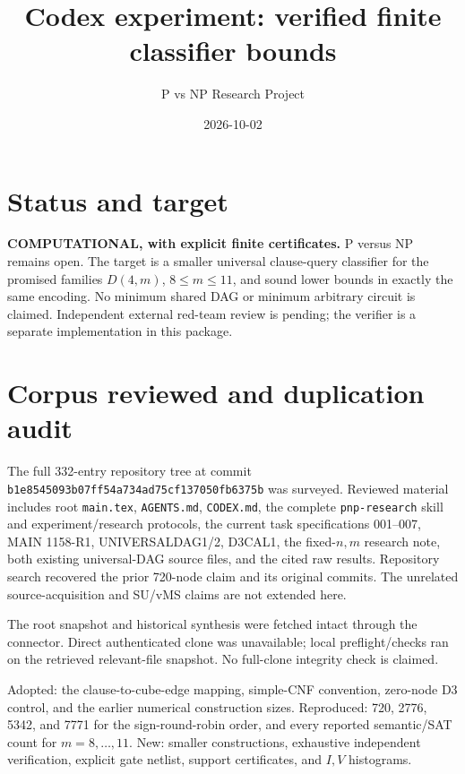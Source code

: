 \documentclass[11pt]{article}
\title{Codex experiment: verified finite classifier bounds}
\author{P vs NP Research Project}
\date{2026-10-02}
\begin{document}
\maketitle
\section*{Status and target}
\textbf{COMPUTATIONAL, with explicit finite certificates.} P versus NP remains open.
The target is a smaller universal clause-query classifier for the promised families
$D(4,m)$, $8\le m\le11$, and sound lower bounds in exactly the same encoding.
No minimum shared DAG or minimum arbitrary circuit is claimed. Independent external
red-team review is pending; the verifier is a separate implementation in this package.

\section*{Corpus reviewed and duplication audit}
The full 332-entry repository tree at commit
\texttt{b1e8545093b07ff54a734ad75cf137050fb6375b} was surveyed. Reviewed material includes
root \texttt{main.tex}, \texttt{AGENTS.md}, \texttt{CODEX.md}, the complete
\texttt{pnp-research} skill and experiment/research protocols, the current task
specifications 001--007, MAIN 1158-R1, UNIVERSALDAG1/2, D3CAL1, the fixed-$n,m$
research note, both existing universal-DAG source files, and the cited raw results.
Repository search recovered the prior 720-node claim and its original commits.
The unrelated source-acquisition and SU/vMS claims are not extended here.

The root snapshot and historical synthesis were fetched intact through the connector.
Direct authenticated clone was unavailable; local preflight/checks ran on the
retrieved relevant-file snapshot. No full-clone integrity check is claimed.

Adopted: the clause-to-cube-edge mapping, simple-CNF convention, zero-node D3
control, and the earlier numerical construction sizes. Reproduced: 720, 2776,
5342, and 7771 for the sign-round-robin order, and every reported semantic/SAT
count for $m=8,\ldots,11$. New: smaller constructions, exhaustive independent
verification, explicit gate netlist, support certificates, and $I,V$ histograms.
\end{document}
